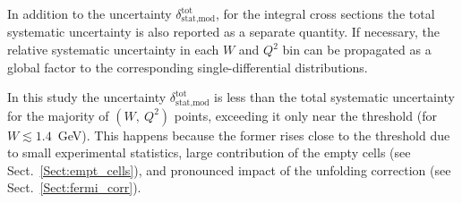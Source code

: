 

In addition to the uncertainty $\delta_{\text{stat,mod}}^{\text{tot}}$, for the integral cross sections the total systematic uncertainty is also reported as a separate quantity. If necessary, the relative systematic uncertainty in each $W$ and $Q^{2}$ bin can be propagated as a global factor to the corresponding single-differential distributions.


In this study the uncertainty $\delta_{\text{stat,mod}}^{\text{tot}}$ is less than the total systematic uncertainty for the majority of $(W,~Q^{2})$ points, exceeding it only near the threshold (for $W \lesssim 1.4$~GeV). This happens because the former rises close to the threshold due to small experimental statistics, large contribution of the empty cells (see Sect.~\ref{Sect:empt_cells}), and pronounced impact of the unfolding correction (see Sect.~\ref{Sect:fermi_corr}). %
